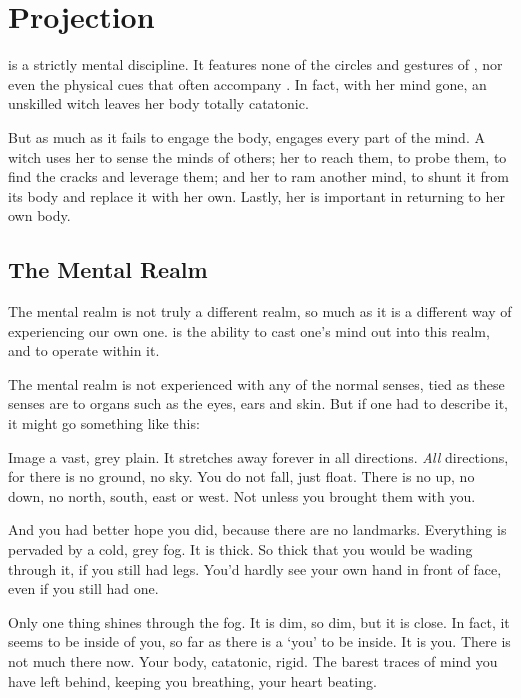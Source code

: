 \chapter{Projection}

 is a strictly mental discipline.
It features none of the circles and gestures of , nor even the physical cues that often accompany .
In fact, with her mind gone, an unskilled witch leaves her body totally catatonic.

But as much as it fails to engage the body,  engages every part of the mind.
A witch uses her  to sense the minds of others; her  to reach them, to probe them, to find the cracks and leverage them; and her  to ram another mind, to shunt it from its body and replace it with her own.
Lastly, her  is important in returning to her own body.

\section{The Mental Realm}

The mental realm is not truly a different realm, so much as it is a different way of experiencing our own one.
 is the ability to cast one's mind out into this realm, and to operate within it.

The mental realm is not experienced with any of the normal senses, tied as these senses are to organs such as the eyes, ears and skin.
But if one had to describe it, it might go something like this:

Image a vast, grey plain.
It stretches away forever in all directions.
\emph{All} directions, for there is no ground, no sky.
You do not fall, just float.
There is no up, no down, no north, south, east or west.
Not unless you brought them with you.

And you had better hope you did, because there are no landmarks.
Everything is pervaded by a cold, grey fog.
It is thick.
So thick that you would be wading through it, if you still had legs.
You'd hardly see your own hand in front of face, even if you still had one.

Only one thing shines through the fog.
It is dim, so dim, but it is close.
In fact, it seems to be inside of you, so far as there is a `you' to be inside.
It is you.
There is not much there now.
Your body, catatonic, rigid.
The barest traces of mind you have left behind, keeping you breathing, your heart beating.

